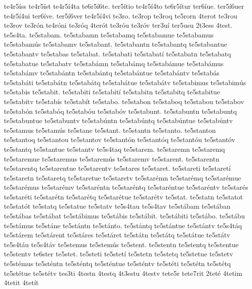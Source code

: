 {te4r5^^edss
te4r5^^edst
te4r5^^ed4ta
te6r5^^ed6te.
ter5^^edtio
te4r5^^ed4to
te6r5^^edtur
ter6^^edue.
ter5^^ed6uer
te4r5^^ed4ui
ter6^^edve.
ter5^^ed6ver
te4r5^^ed4vi
te3ro.
te3rop
te3roq
te5rorn
4terot
te3rou
te3rov
te3r^^f3n
te4r^^f3ni
te3r^^f3q
4ter^^f3t
te3r^^f3u
te3r^^f3v
ter3u^^ed
ter5usu
2t3ess
4test.
te5s4ta.
te5stabam.
te5stabamn
te5stabamq
te5stabamue
te5stabamus
te5stabam^^fas
te5stabamv
te5stabant.
te5stabantn
te5stabantq
te5stabantue
te5stabantv
te5stabas
te5stabat.
te5stabati
te5stabat^^ed
te5stabatn
te5stabatq
te5stabatue
te5stabatv
te5stab^^e1mn
te5stab^^e1mq
te5stab^^e1mue
te5stab^^e1mus
te5stab^^e1mv
te5stab^^e1ntn
te5stab^^e1ntq
te5stab^^e1ntue
te5stab^^e1ntv
te5stab^^e1s
te5stab^^e1ti
te5stab^^e1tn
te5stab^^e1tq
te5stab^^e1tue
te5stab^^e1tv
te5stabimus
te5stabim^^fas
te5stabis
te5stabit.
te5stabiti
te5stabit^^ed
te5stabitn
te5stabitq
te5stabitue
te5stabitv
te5stab^^eds
te5stab^^edt
te5stabo.
te5stabon
te5staboq
te5stabou
te5stabov
te5stab^^f3n
te5stab^^f3q
te5stab^^f3u
te5stab^^f3v
te5stabunt.
te5stabuntn
te5stabuntq
te5stabuntue
te5stabuntv
te5stab^^fantn
te5stab^^fantq
te5stab^^fantue
te5stab^^fantv
te5stamus
te5stam^^fas
te5stane
te5stant.
te5stantn
te5stanto.
te5stanton
te5stantoq
te5stantou
te5stantov
te5stant^^f3n
te5stant^^f3q
te5stant^^f3u
te5stant^^f3v
te5stantq
te5stantue
te5stantv
te5s4taq
te5starem.
te5staremn
te5staremq
te5staremue
te5staremus
te5starem^^fas
te5staremv
te5starent.
te5starentn
te5starentq
te5starentue
te5starentv
te5stares
te5staret.
te5stareti
te5staret^^ed
te5staretn
te5staretq
te5staretue
te5staretv
te5star^^e9mn
te5star^^e9mq
te5star^^e9mue
te5star^^e9mus
te5star^^e9mv
te5star^^e9ntn
te5star^^e9ntq
te5star^^e9ntue
te5star^^e9ntv
te5star^^e9s
te5star^^e9ti
te5star^^e9tn
te5star^^e9tq
te5star^^e9tue
te5star^^e9tv
te5stat.
te5statn
te5statot
te5stat^^f3t
te5statq
te5statue
te5statv
te5s4tau
te5s4tav
te5st^^e1bam
te5st^^e1ban
te5st^^e1bas
te5st^^e1bat
te5st^^e1bimus
te5st^^e1bis
te5st^^e1bit.
te5st^^e1biti
te5st^^e1bo.
te5st^^e1bu
te5st^^e1mus
te5st^^e1ne
te5st^^e1ntn
te5st^^e1nto.
te5st^^e1ntq
te5st^^e1ntue
te5st^^e1ntv
te5s4t^^e1q
te5st^^e1rem
te5st^^e1rent
te5st^^e1res
te5st^^e1ret
te5st^^e1tn
te5st^^e1tq
te5st^^e1tue
te5st^^e1tv
te5s4t^^e1u
te5s4t^^e1v
te5stemus
te5stem^^fas
te5stent.
te5stentn
te5stentq
te5stentue
te5stentv
te6ster
te5stet.
te5steti
te5stet^^ed
te5stetn
te5stetq
te5stetue
te5stetv
te5st^^e9mus
te5st^^e9ntn
te5st^^e9ntq
te5st^^e9ntue
te5st^^e9ntv
te5st^^e9ti
te5st^^e9tn
te5st^^e9tq
te5st^^e9tue
te5st^^e9tv
tes3ti
4testn
4testq
4t3estu
4testv
tete5r
tete7rit
2tet^^e9
4tetim
4tetit
4tet^^edt
}
